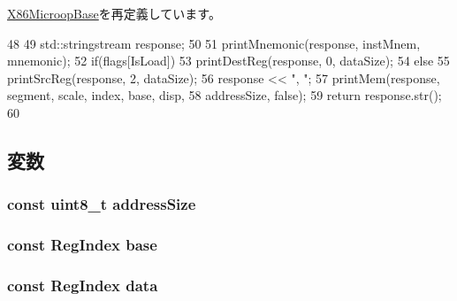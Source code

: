 \hyperlink{classX86ISA_1_1X86MicroopBase_a95d323a22a5f07e14d6b4c9385a91896}{X86MicroopBase}を再定義しています。


\begin{DoxyCode}
48     {
49         std::stringstream response;
50 
51         printMnemonic(response, instMnem, mnemonic);
52         if(flags[IsLoad])
53             printDestReg(response, 0, dataSize);
54         else
55             printSrcReg(response, 2, dataSize);
56         response << ", ";
57         printMem(response, segment, scale, index, base, disp,
58                 addressSize, false);
59         return response.str();
60     }
\end{DoxyCode}


\subsection{変数}
\hypertarget{classX86ISA_1_1LdStOp_a115c95fa2df0696caf11180fdf625657}{
\subsubsection[{addressSize}]{\setlength{\rightskip}{0pt plus 5cm}const uint8\_\-t {\bf addressSize}}}
\label{classX86ISA_1_1LdStOp_a115c95fa2df0696caf11180fdf625657}
\hypertarget{classX86ISA_1_1LdStOp_aea1da85e3f0ea021e5bd319ae984fccd}{
\subsubsection[{base}]{\setlength{\rightskip}{0pt plus 5cm}const {\bf RegIndex} {\bf base}}}
\label{classX86ISA_1_1LdStOp_aea1da85e3f0ea021e5bd319ae984fccd}
\hypertarget{classX86ISA_1_1LdStOp_a2dd4f443c6c437abbe8912de0d5853bd}{
\subsubsection[{data}]{\setlength{\rightskip}{0pt plus 5cm}const {\bf RegIndex} {\bf data}}}
